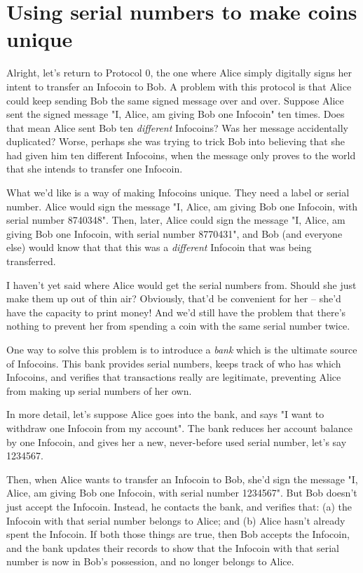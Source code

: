 \documentclass[12pt]{book}
\newcounter{problem}[chapter]
\begin{document}
\section{Using serial numbers to make coins unique}

Alright, let's return to Protocol 0, the one where Alice simply
digitally signs her intent to transfer an Infocoin to Bob.  A problem
with this protocol is that Alice could keep sending Bob the same
signed message over and over.  Suppose Alice sent the signed message
"I, Alice, am giving Bob one Infocoin" ten times.  Does that mean
Alice sent Bob ten \emph{different} Infocoins?  Was her message
accidentally duplicated?  Worse, perhaps she was trying to trick Bob
into believing that she had given him ten different Infocoins, when
the message only proves to the world that she intends to transfer one
Infocoin.

What we'd like is a way of making Infocoins unique.  They need a label
or serial number.  Alice would sign the message "I, Alice, am giving
Bob one Infocoin, with serial number 8740348".  Then, later, Alice
could sign the message "I, Alice, am giving Bob one Infocoin, with
serial number 8770431", and Bob (and everyone else) would know that
that this was a \emph{different} Infocoin that was being transferred.

I haven't yet said where Alice would get the serial numbers from.
Should she just make them up out of thin air?  Obviously, that'd be
convenient for her -- she'd have the capacity to print money!  And
we'd still have the problem that there's nothing to prevent her from
spending a coin with the same serial number twice.

One way to solve this problem is to introduce a \emph{bank} which is
the ultimate source of Infocoins.  This bank provides serial numbers,
keeps track of who has which Infocoins, and verifies that transactions
really are legitimate, preventing Alice from making up serial numbers
of her own.

In more detail, let's suppose Alice goes into the bank, and says "I
want to withdraw one Infocoin from my account".  The bank reduces her
account balance by one Infocoin, and gives her a new, never-before
used serial number, let's say 1234567.

Then, when Alice wants to transfer an Infocoin to Bob, she'd sign the
message "I, Alice, am giving Bob one Infocoin, with serial number
1234567".  But Bob doesn't just accept the Infocoin.  Instead, he
contacts the bank, and verifies that: (a) the Infocoin with that
serial number belongs to Alice; and (b) Alice hasn't already spent the
Infocoin.  If both those things are true, then Bob accepts the
Infocoin, and the bank updates their records to show that the Infocoin
with that serial number is now in Bob's possession, and no longer
belongs to Alice.
\end{document}
